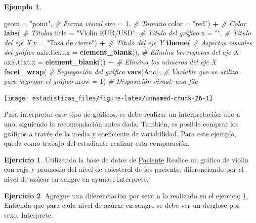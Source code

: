 \documentclass[
  11pt,
]{book}
\newenvironment{Shaded}{\begin{snugshade}}{\end{snugshade}}
\newcommand{\AttributeTok}[1]{\textcolor[rgb]{0.13,0.29,0.53}{#1}}
\newcommand{\CommentTok}[1]{\textcolor[rgb]{0.56,0.35,0.01}{\textit{#1}}}
\newcommand{\DecValTok}[1]{\textcolor[rgb]{0.00,0.00,0.81}{#1}}
\newcommand{\FunctionTok}[1]{\textcolor[rgb]{0.13,0.29,0.53}{\textbf{#1}}}
\newcommand{\NormalTok}[1]{#1}
\newcommand{\SpecialCharTok}[1]{\textcolor[rgb]{0.81,0.36,0.00}{\textbf{#1}}}
\newcommand{\StringTok}[1]{\textcolor[rgb]{0.31,0.60,0.02}{#1}}
\theoremstyle{definition}
\theoremstyle{definition}
\newtheorem{example}{Ejemplo}[chapter]
\theoremstyle{definition}
\newtheorem{exercise}{Ejercicio}[chapter]
\theoremstyle{definition}
\theoremstyle{remark}
\begin{document}
\begin{example}
\begin{Shaded}
\begin{Highlighting}[]
    \AttributeTok{geom =} \StringTok{"point"}\NormalTok{, }\CommentTok{\# Forma visual}
    \AttributeTok{size =} \DecValTok{1}\NormalTok{, }\CommentTok{\# Tamaño}
    \AttributeTok{color =} \StringTok{"red"}\NormalTok{) }\SpecialCharTok{+} \CommentTok{\# Color}
  \FunctionTok{labs}\NormalTok{( }\CommentTok{\# Títulos}
    \AttributeTok{title =} \StringTok{"Violín EUR/USD"}\NormalTok{, }\CommentTok{\# Título del gráfico}
    \AttributeTok{x =} \StringTok{""}\NormalTok{, }\CommentTok{\# Título del eje X}
    \AttributeTok{y =} \StringTok{"Tasa de cierre"}\NormalTok{) }\SpecialCharTok{+} \CommentTok{\# Título del eje Y}
  \FunctionTok{theme}\NormalTok{( }\CommentTok{\# Aspectos visuales del gráfico}
    \AttributeTok{axis.ticks.x =} \FunctionTok{element\_blank}\NormalTok{(), }\CommentTok{\# Elimina las regletas del eje X}
    \AttributeTok{axis.text.x =} \FunctionTok{element\_blank}\NormalTok{()) }\SpecialCharTok{+} \CommentTok{\# Elimina los números del eje X}
  \FunctionTok{facet\_wrap}\NormalTok{( }\CommentTok{\# Segregación del gráfico}
    \FunctionTok{vars}\NormalTok{(Ano), }\CommentTok{\# Variable que se utiliza para segregar el gráfico}
    \AttributeTok{nrow =} \DecValTok{1}\NormalTok{) }\CommentTok{\# Disposición visual: una fila}
\end{Highlighting}
\end{Shaded}

\begin{center}\texttt{[image: estadisticas\_files/figure-latex/unnamed-chunk-26-1]} \end{center}

Para interpretar este tipo de gráficos, se debe realizar un interpretación uno a uno, siguiendo la recomendación antes dada. También, es posible comprar los gráficos a través de la media y coeficiente de variabilidad. Para este ejemplo, queda como trabajo del estudiante realizar esta comparación.
\end{example}

\begin{exercise}
\protect\hypertarget{exr:violin-colesterol-azucar}{}\label{exr:violin-colesterol-azucar}Utilizando la base de datos de \hyperref[Pacientes]{Paciente} Realice un gráfico de violín con caja y promedio del nivel de colesterol de los paciente, diferenciando por el nivel de azúcar en sangre en ayunas. Interprete.
\end{exercise}

\begin{exercise}
Agregue una diferenciación por sexo a lo realizado en el ejercicio \ref{exr:violin-colesterol-azucar}. Entienda que para cada nivel de azúcar en sangre se debe ver un desglose por sexo. Interprete.
\end{exercise}
\end{document}
